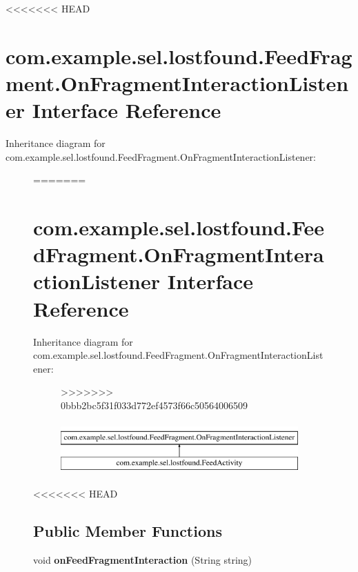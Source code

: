 <<<<<<< HEAD
\hypertarget{interfacecom_1_1example_1_1sel_1_1lostfound_1_1FeedFragment_1_1OnFragmentInteractionListener}{\section{com.\-example.\-sel.\-lostfound.\-Feed\-Fragment.\-On\-Fragment\-Interaction\-Listener Interface Reference}
\label{interfacecom_1_1example_1_1sel_1_1lostfound_1_1FeedFragment_1_1OnFragmentInteractionListener}
}
Inheritance diagram for com.\-example.\-sel.\-lostfound.\-Feed\-Fragment.\-On\-Fragment\-Interaction\-Listener\-:\begin{figure}[H]
=======
\hypertarget{interfacecom_1_1example_1_1sel_1_1lostfound_1_1FeedFragment_1_1OnFragmentInteractionListener}{\section{com.\-example.\-sel.\-lostfound.\-Feed\-Fragment.\-On\-Fragment\-Interaction\-Listener \-Interface \-Reference}
\label{interfacecom_1_1example_1_1sel_1_1lostfound_1_1FeedFragment_1_1OnFragmentInteractionListener}
}
\-Inheritance diagram for com.\-example.\-sel.\-lostfound.\-Feed\-Fragment.\-On\-Fragment\-Interaction\-Listener\-:\begin{figure}[H]
>>>>>>> 0bbb2bc5f31f033d772ef4573f66c50564006509
\begin{center}
\leavevmode
\includegraphics[height=2.000000cm]{interfacecom_1_1example_1_1sel_1_1lostfound_1_1FeedFragment_1_1OnFragmentInteractionListener}
\end{center}
\end{figure}
<<<<<<< HEAD
\subsection*{Public Member Functions}
\begin{DoxyCompactItemize}
\item 
\hypertarget{interfacecom_1_1example_1_1sel_1_1lostfound_1_1FeedFragment_1_1OnFragmentInteractionListener_a147ba47e242fae7f6095d672ab95d18a}{void {\bfseries on\-Feed\-Fragment\-Interaction} (String string)}\label{interfacecom_1_1example_1_1sel_1_1lostfound_1_1FeedFragment_1_1OnFragmentInteractionListener_a147ba47e242fae7f6095d672ab95d18a}


\end{DoxyCompactItemize}
\end{figure}
